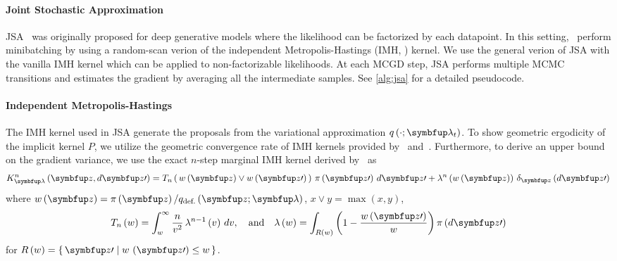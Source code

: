 \vspace{-0.05in}
\paragraph{Joint Stochastic Approximation}
JSA~\citep{pmlr-v124-ou20a} was originally proposed for deep generative models where the likelihood can be factorized by each datapoint.
In this setting,~\citeauthor{pmlr-v124-ou20a} perform minibatching by using a random-scan verion of the independent Metropolis-Hastings (IMH, \citealt{hastings_monte_1970,robert_monte_2004}) kernel.
We use the general verion of JSA with the vanilla IMH kernel which can be applied to non-factorizable likelihoods.
At each MCGD step, JSA performs multiple MCMC transitions and estimates the gradient by averaging all the intermediate samples.
See \cref{alg:jsa} for a detailed pseudocode.

\vspace{-0.05in}
\paragraph{Independent Metropolis-Hastings}
The IMH kernel used in JSA generate the proposals from the variational approximation \(q\left(\cdot; \vlambda_t\right)\).
To show geometric ergodicity of the implicit kernel \(P\), we utilize the geometric convergence rate of IMH kernels provided by~\citet[Theorem 2.1]{10.2307/2242610} and~\citet{wang_exact_2020}.
Furthermore, to derive an upper bound on the gradient variance, we use the exact \(n\)-step marginal IMH kernel derived by~\citet{Smith96exacttransition} as
{%
  \begin{align}
  K^n_{\vlambda}\left(\vz, d\vz\prime\right) 
  = T_n\left(\, w\left(\vz\right) \vee w\left(\vz\prime\right)\,\right) \, \pi\left(\vz\prime\right) \, d\vz\prime
  + \lambda^n\left(w\left(\vz\right)\right) \, \delta_{\vz}\left(d\vz\prime\right)
  \label{eq:imh_exact_kernel}
  \end{align}
}%
where {\(w\left(\vz\right) = \pi\left(\vz\right)/q_{\text{def.}}\left(\vz; \vlambda\right)\), \(x \vee y = \max\left(x, y\right)\)},
{\small
  \begin{align}
    T_n\left(w\right)      = \int_w^{\infty}
    \frac{n}{v^2}
    \, \lambda^{n-1}\left(v\right)\,dv,
    \quad\text{and}\quad
    \lambda\left(w\right) =
    \int_{R\left(w\right)}
    \left( 1 - \frac{w\left(\vz\prime\right)}{w}  \right)
    \pi\left(d\vz\prime\right)\label{eq:T_lambda}
  \end{align}
}
for {\(R\left(w\right) = \{\, \vz\prime \mid w\,\left(\vz\prime\right) \leq w \,\}\)}.
%


%

